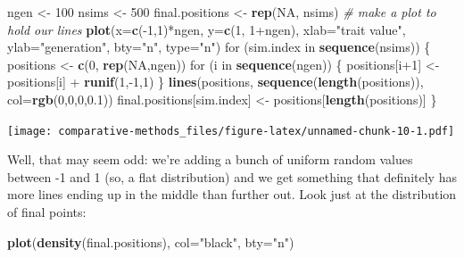 \documentclass[]{book}
\newenvironment{Shaded}{\begin{snugshade}}{\end{snugshade}}
\newcommand{\KeywordTok}[1]{\textcolor[rgb]{0.13,0.29,0.53}{\textbf{{#1}}}}
\newcommand{\DataTypeTok}[1]{\textcolor[rgb]{0.13,0.29,0.53}{{#1}}}
\newcommand{\DecValTok}[1]{\textcolor[rgb]{0.00,0.00,0.81}{{#1}}}
\newcommand{\FloatTok}[1]{\textcolor[rgb]{0.00,0.00,0.81}{{#1}}}
\newcommand{\StringTok}[1]{\textcolor[rgb]{0.31,0.60,0.02}{{#1}}}
\newcommand{\CommentTok}[1]{\textcolor[rgb]{0.56,0.35,0.01}{\textit{{#1}}}}
\newcommand{\OtherTok}[1]{\textcolor[rgb]{0.56,0.35,0.01}{{#1}}}
\newcommand{\NormalTok}[1]{{#1}}
\theoremstyle{definition}
\theoremstyle{definition}
\theoremstyle{remark}
\begin{document}
\begin{Shaded}
\begin{Highlighting}[]
\NormalTok{ngen <-}\StringTok{ }\DecValTok{100}
\NormalTok{nsims <-}\StringTok{ }\DecValTok{500}
\NormalTok{final.positions <-}\StringTok{ }\KeywordTok{rep}\NormalTok{(}\OtherTok{NA}\NormalTok{, nsims)}
\CommentTok{# make a plot to hold our lines}
\KeywordTok{plot}\NormalTok{(}\DataTypeTok{x=}\KeywordTok{c}\NormalTok{(-}\DecValTok{1}\NormalTok{,}\DecValTok{1}\NormalTok{)*ngen, }\DataTypeTok{y=}\KeywordTok{c}\NormalTok{(}\DecValTok{1}\NormalTok{, }\DecValTok{1}\NormalTok{+ngen), }\DataTypeTok{xlab=}\StringTok{"trait value"}\NormalTok{, }\DataTypeTok{ylab=}\StringTok{"generation"}\NormalTok{, }\DataTypeTok{bty=}\StringTok{"n"}\NormalTok{, }\DataTypeTok{type=}\StringTok{"n"}\NormalTok{)}
\NormalTok{for (sim.index in }\KeywordTok{sequence}\NormalTok{(nsims)) \{}
  \NormalTok{positions <-}\StringTok{ }\KeywordTok{c}\NormalTok{(}\DecValTok{0}\NormalTok{, }\KeywordTok{rep}\NormalTok{(}\OtherTok{NA}\NormalTok{,ngen))}
  \NormalTok{for (i in }\KeywordTok{sequence}\NormalTok{(ngen)) \{}
    \NormalTok{positions[i}\DecValTok{+1}\NormalTok{] <-}\StringTok{ }\NormalTok{positions[i] +}\StringTok{ }\KeywordTok{runif}\NormalTok{(}\DecValTok{1}\NormalTok{,-}\DecValTok{1}\NormalTok{,}\DecValTok{1}\NormalTok{)}
  \NormalTok{\}}
  \KeywordTok{lines}\NormalTok{(positions, }\KeywordTok{sequence}\NormalTok{(}\KeywordTok{length}\NormalTok{(positions)), }\DataTypeTok{col=}\KeywordTok{rgb}\NormalTok{(}\DecValTok{0}\NormalTok{,}\DecValTok{0}\NormalTok{,}\DecValTok{0}\NormalTok{,}\FloatTok{0.1}\NormalTok{))}
  \NormalTok{final.positions[sim.index] <-}\StringTok{ }\NormalTok{positions[}\KeywordTok{length}\NormalTok{(positions)]}
\NormalTok{\}}
\end{Highlighting}
\end{Shaded}

\texttt{[image: comparative-methods\_files/figure-latex/unnamed-chunk-10-1.pdf]}

Well, that may seem odd: we're adding a bunch of uniform random values
between -1 and 1 (so, a flat distribution) and we get something that
definitely has more lines ending up in the middle than further out. Look
just at the distribution of final points:

\begin{Shaded}
\begin{Highlighting}[]
\KeywordTok{plot}\NormalTok{(}\KeywordTok{density}\NormalTok{(final.positions), }\DataTypeTok{col=}\StringTok{"black"}\NormalTok{, }\DataTypeTok{bty=}\StringTok{"n"}\NormalTok{)}
\end{Highlighting}
\end{Shaded}
\end{document}
